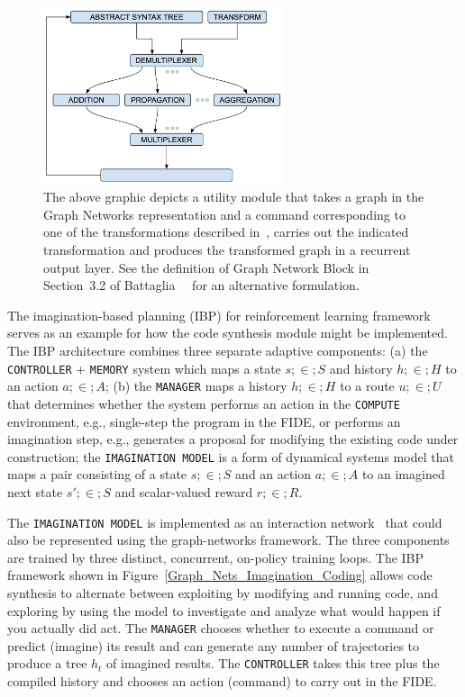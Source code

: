 \begin{figure}
%
  \begin{center} 
    \includegraphics[width=200pt]{./figures/Graph_Nets_Transformer_Utility.png} %
  \end{center}
%
  \caption{The above graphic depicts a utility module that takes a graph in the Graph Networks representation and a command corresponding to one of the transformations described in~\cite{JohnsonICLR-17}, carries out the indicated transformation and produces the transformed graph in a recurrent output layer. See the definition of Graph Network Block in Section~3.2 of Battaglia~\etal{}~\cite{BattagliaetalCoRR-18} for an alternative formulation.}
%
  \label{fig_Graph_Nets_Transformer_Utility}
%
\end{figure}


The imagination-based planning (IBP) for reinforcement learning framework~\cite{PascanuetalCoRR-17} serves as an example for how the code synthesis module might be implemented. The IBP architecture combines three separate adaptive components: (a) the {\tt{CONTROLLER}} + {\tt{MEMORY}} system which maps a state $s;\in{};S$ and history $h;\in{};H$ to an action $a;\in{};A$; (b) the {\tt{MANAGER}} maps a history $h;\in{};H$ to a route $u;\in{};U$ that determines whether the system performs an action in the {\tt{COMPUTE}} environment, e.g., single-step the program in the FIDE, or performs an imagination step, e.g., generates a proposal for modifying the existing code under construction; the {\tt{IMAGINATION MODEL}} is a form of dynamical systems model that maps a pair consisting of a state $s;\in{};S$ and an action $a;\in{};A$ to an imagined next state $s';\in{};S$ and scalar-valued reward $r;\in{};R$.

The {\tt{IMAGINATION MODEL}} is implemented as an interaction network~\cite{BattagliaetalNIPS-16} that could also be represented using the graph-networks framework. The three components are trained by three distinct, concurrent, on-policy training loops. The IBP framework shown in Figure~\ref{Graph_Nets_Imagination_Coding} allows code synthesis to alternate between exploiting by modifying and running code, and exploring by using the model to investigate and analyze what would happen if you actually did act. The {\tt{MANAGER}} chooses whether to execute a command or predict (imagine) its result and can generate any number of trajectories to produce a tree $h_t$ of imagined results. The {\tt{CONTROLLER}} takes this tree plus the compiled history and chooses an action (command) to carry out in the FIDE.

